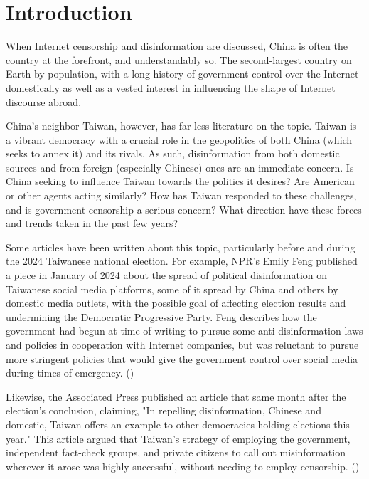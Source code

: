 \section{Introduction}\label{sec:intro}

When Internet censorship and disinformation are discussed, China is often the country at the forefront, and understandably so. The second-largest
country on Earth by population, with a long history of government control over the Internet domestically as well as a vested interest in influencing
the shape of Internet discourse abroad. 

China's neighbor Taiwan, however, has far less literature on the topic. Taiwan is a vibrant democracy with a crucial role in the geopolitics of both China
(which seeks to annex it) and its rivals. As such, disinformation from both domestic sources and from foreign (especially Chinese) ones are an immediate
concern. Is China seeking to influence Taiwan towards the politics it desires? Are American or other agents acting similarly? How has Taiwan responded to these
challenges, and is government censorship a serious concern? What direction have these forces and trends taken in the past few years?

Some articles have been written about this topic, particularly before and during the 2024 Taiwanese national election. For example, NPR's Emily Feng published
a piece in January of 2024 about the spread of political disinformation on Taiwanese social media platforms, some of it spread by China and others by domestic
media outlets, with the possible goal of affecting election results and undermining the Democratic Progressive Party. Feng describes how the government had 
begun at time of writing to pursue some  anti-disinformation laws and policies in cooperation with Internet companies, but was reluctant to pursue more 
stringent policies that would give the government control over social media during times of emergency. (\cite{npr-taiwan-misinfo})

Likewise, the Associated Press published an article that same month after the election's conclusion, claiming, "In repelling disinformation, Chinese and 
domestic, Taiwan offers an example to other democracies holding elections this year." This article argued that Taiwan's strategy of employing the government,
independent fact-check groups, and private citizens to call out misinformation wherever it arose was highly successful, without needing to employ censorship.
(\cite{ap-taiwan-misinfo})

